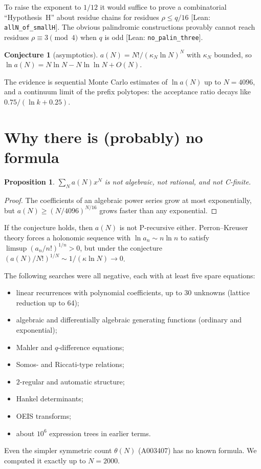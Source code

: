\documentclass[11pt]{article}
\newtheorem{proposition}[theorem]{Proposition}
\theoremstyle{definition}
\newtheorem{conjecture}[theorem]{Conjecture}
\theoremstyle{remark}
\newcommand{\lean}[1]{\textsf{\small[Lean: \texttt{#1}]}}
\begin{document}
To raise the exponent to $1/12$ it would suffice to prove a combinatorial
``Hypothesis~H'' about residue chains for residues $\rho\le q/16$
\lean{allN\_of\_smallH}. The obvious palindromic constructions provably cannot reach
residues $\rho\equiv 3\pmod 4$ when $q$ is odd \lean{no\_palin\_three}.

\begin{conjecture}[asymptotics]
$a(N)=N!/(\kappa_N\ln N)^N$ with $\kappa_N$ bounded, so
$\ln a(N)=N\ln N-N\ln\ln N+O(N)$.
\end{conjecture}

The evidence is sequential Monte Carlo estimates of $\ln a(N)$ up to $N=4096$, and a
continuum limit of the prefix polytopes: the acceptance ratio decays like
$0.75/(\ln k+0.25)$.

\section{Why there is (probably) no formula}

\begin{proposition}
$\sum_N a(N)x^N$ is not algebraic, not rational, and not C-finite.
\end{proposition}

\begin{proof}
The coefficients of an algebraic power series grow at most exponentially, but
$a(N)\ge(N/4096)^{N/16}$ grows faster than any exponential.
\end{proof}

If the conjecture holds, then $a(N)$ is not P-recursive either. Perron--Kreuser theory
forces a holonomic sequence with $\ln a_n\sim n\ln n$ to satisfy
$\limsup(a_n/n!)^{1/n}>0$, but under the conjecture $(a(N)/N!)^{1/N}\sim1/(\kappa\ln N)\to0$.

The following searches were all negative, each with at least five spare equations:
\begin{itemize}
  \item linear recurrences with polynomial coefficients, up to 30 unknowns (lattice
    reduction up to 64);
  \item algebraic and differentially algebraic generating functions (ordinary and
    exponential);
  \item Mahler and $q$-difference equations;
  \item Somos- and Riccati-type relations;
  \item $2$-regular and automatic structure;
  \item Hankel determinants;
  \item OEIS transforms;
  \item about $10^6$ expression trees in earlier terms.
\end{itemize}
Even the simpler symmetric count $\theta(N)$ (A003407) has no known formula. We computed
it exactly up to $N=2000$.
\end{document}
